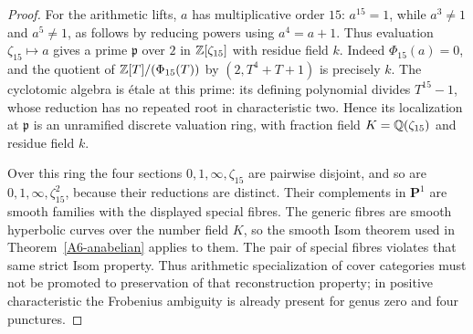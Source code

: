 \begin{proof}
For the arithmetic lifts, $a$ has multiplicative order $15$:
$a^{15}=1$, while $a^3\ne1$ and $a^5\ne1$, as follows by reducing
powers using $a^4=a+1$. Thus evaluation $\zeta_{15}\mapsto a$
gives a prime $\mathfrak p$ over $2$ in ${\mathbb{Z}}[\zeta_{15}]$ with
residue field $k$. Indeed $\Phi_{15}(a)=0$, and the quotient of
${\mathbb{Z}}[T]/(\Phi_{15}(T))$ by $(2,T^4+T+1)$ is precisely $k$.
The cyclotomic algebra is \'etale at this prime: its defining
polynomial divides $T^{15}-1$, whose reduction has no repeated root
in characteristic two. Hence its localization at $\mathfrak p$ is
an unramified discrete valuation ring, with fraction field
$K={\mathbb{Q}}(\zeta_{15})$ and residue field $k$.

Over this ring the four sections $0,1,\infty,\zeta_{15}$ are
pairwise disjoint, and so are $0,1,\infty,\zeta_{15}^2$, because
their reductions are distinct. Their complements in $\mathbf P^1$
are smooth families with the displayed special fibres. The generic
fibres are smooth hyperbolic curves over the number field $K$, so
the smooth Isom theorem used in Theorem~\ref{A6-anabelian} applies to
them. The pair of special fibres violates that same strict Isom
property. Thus arithmetic specialization of cover categories must
not be promoted to preservation of that reconstruction property;
in positive characteristic the Frobenius ambiguity is already
present for genus zero and four punctures.
\end{proof}

